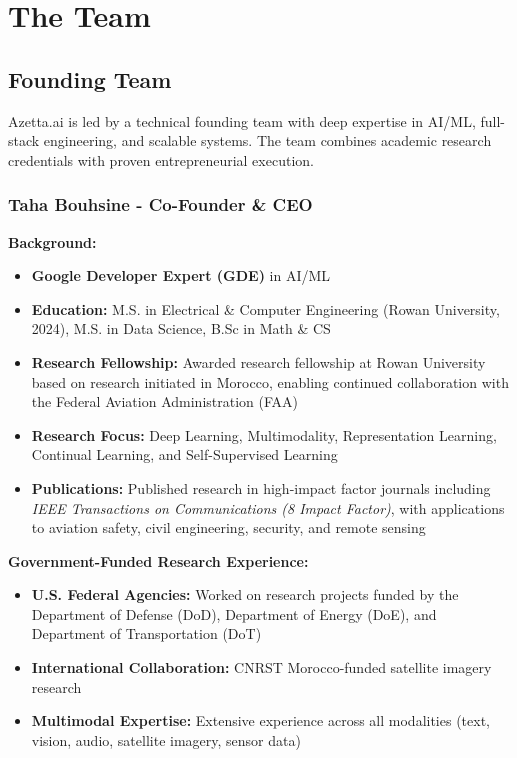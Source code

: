 \section{The Team}

\subsection{Founding Team}

Azetta.ai is led by a technical founding team with deep expertise in AI/ML, full-stack engineering, and scalable systems. The team combines academic research credentials with proven entrepreneurial execution.

\subsubsection{Taha Bouhsine - Co-Founder \& CEO}

\textbf{Background:}
\begin{itemize}[noitemsep]
    \item \textbf{Google Developer Expert (GDE)} in AI/ML
    \item \textbf{Education:} M.S. in Electrical \& Computer Engineering (Rowan University, 2024), M.S. in Data Science, B.Sc in Math \& CS
    \item \textbf{Research Fellowship:} Awarded research fellowship at Rowan University based on research initiated in Morocco, enabling continued collaboration with the Federal Aviation Administration (FAA)
    \item \textbf{Research Focus:} Deep Learning, Multimodality, Representation Learning, Continual Learning, and Self-Supervised Learning
    \item \textbf{Publications:} Published research in high-impact factor journals including \textit{IEEE Transactions on Communications (8 Impact Factor)}, with applications to aviation safety, civil engineering, security, and remote sensing
\end{itemize}

\textbf{Government-Funded Research Experience:}
\begin{itemize}[noitemsep]
    \item \textbf{U.S. Federal Agencies:} Worked on research projects funded by the Department of Defense (DoD), Department of Energy (DoE), and Department of Transportation (DoT)
    \item \textbf{International Collaboration:} CNRST Morocco-funded satellite imagery research
    \item \textbf{Multimodal Expertise:} Extensive experience across all modalities (text, vision, audio, satellite imagery, sensor data)
\end{itemize}

